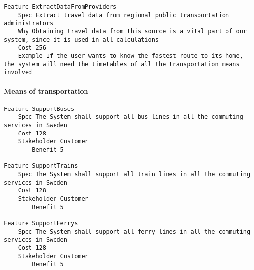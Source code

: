 \begin{lstlisting}
Feature ExtractDataFromProviders
	Spec Extract travel data from regional public transportation administrators
	Why Obtaining travel data from this source is a vital part of our system, since it is used in all calculations
	Cost 256
	Example If the user wants to know the fastest route to its home, the system will need the timetables of all the transportation means involved

\end{lstlisting}
		
				
			 \paragraph{Means of transportation}


\begin{lstlisting}
Feature SupportBuses
	Spec The System shall support all bus lines in all the commuting services in Sweden
	Cost 128
	Stakeholder Customer
		Benefit 5

Feature SupportTrains
	Spec The System shall support all train lines in all the commuting services in Sweden
	Cost 128
	Stakeholder Customer
		Benefit 5

Feature SupportFerrys
	Spec The System shall support all ferry lines in all the commuting services in Sweden
	Cost 128
	Stakeholder Customer
		Benefit 5

\end{lstlisting}
